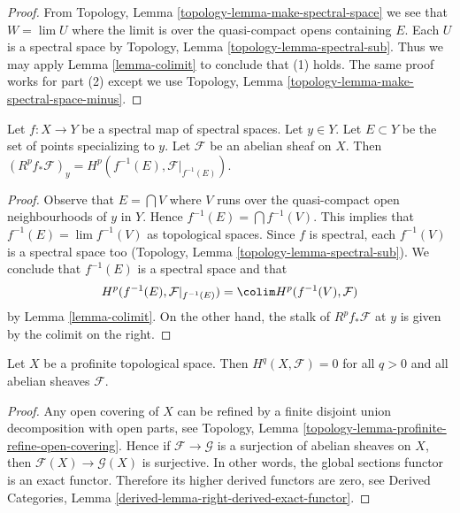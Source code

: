 \begin{proof}
From Topology, Lemma \ref{topology-lemma-make-spectral-space}
we see that $W = \lim U$ where the limit is over the quasi-compact
opens containing $E$. Each $U$ is a spectral space by
Topology, Lemma \ref{topology-lemma-spectral-sub}.
Thus we may apply Lemma \ref{lemma-colimit} to conclude that (1) holds.
The same proof works for part (2) except we use
Topology, Lemma \ref{topology-lemma-make-spectral-space-minus}.
\end{proof}

\begin{lemma}
\label{lemma-proper-base-change-spectral}
Let $f : X \to Y$ be a spectral map of spectral spaces. Let $y \in Y$.
Let $E \subset Y$ be the set of points specializing to $y$.
Let $\mathcal{F}$ be an abelian sheaf on $X$.
Then $(R^pf_*\mathcal{F})_y = H^p(f^{-1}(E), \mathcal{F}|_{f^{-1}(E)})$.
\end{lemma}

\begin{proof}
Observe that $E = \bigcap V$ where $V$ runs over the quasi-compact
open neighbourhoods of $y$ in $Y$. Hence $f^{-1}(E) = \bigcap f^{-1}(V)$.
This implies that $f^{-1}(E) = \lim f^{-1}(V)$ as topological spaces.
Since $f$ is spectral, each $f^{-1}(V)$ is a spectral space too
(Topology, Lemma \ref{topology-lemma-spectral-sub}).
We conclude that $f^{-1}(E)$ is a spectral space and that
$$
H^p(f^{-1}(E), \mathcal{F}|_{f^{-1}(E)}) =
\colim H^p(f^{-1}(V), \mathcal{F})
$$
by Lemma \ref{lemma-colimit}. On the other hand, the stalk of
$R^pf_*\mathcal{F}$ at $y$ is given by the colimit on the right.
\end{proof}

\begin{lemma}
\label{lemma-vanishing-for-profinite}
Let $X$ be a profinite topological space. Then $H^q(X, \mathcal{F}) = 0$
for all $q > 0$ and all abelian sheaves $\mathcal{F}$.
\end{lemma}

\begin{proof}
Any open covering of $X$ can be refined by a finite disjoint union
decomposition with open parts, see
Topology, Lemma \ref{topology-lemma-profinite-refine-open-covering}.
Hence if $\mathcal{F} \to \mathcal{G}$ is a surjection of abelian
sheaves on $X$, then $\mathcal{F}(X) \to \mathcal{G}(X)$ is surjective.
In other words, the global sections functor is an exact functor.
Therefore its higher derived functors are zero, see
Derived Categories, Lemma \ref{derived-lemma-right-derived-exact-functor}.
\end{proof}

